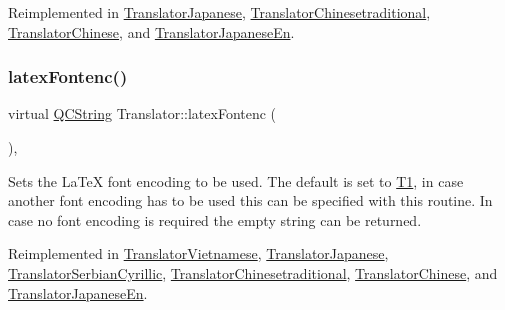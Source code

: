 Reimplemented in \mbox{\hyperlink{class_translator_japanese_abcfec41fcfaf972e191aa2bf14057b2f}{Translator\+Japanese}}, \mbox{\hyperlink{class_translator_chinesetraditional_a76884101bd57a4a09883de76da69aa3f}{Translator\+Chinesetraditional}}, \mbox{\hyperlink{class_translator_chinese_aab889b0b3d8f44915e8b56ecf9e3e5df}{Translator\+Chinese}}, and \mbox{\hyperlink{class_translator_japanese_en_a33a1f40ad9680e0277b0d47bb40af96e}{Translator\+Japanese\+En}}.

\mbox{\label{class_translator_a573b483369d8d7cf7d85831a9da356be}} 
\subsubsection{\texorpdfstring{latexFontenc()}{latexFontenc()}}
{\footnotesize\ttfamily virtual \mbox{\hyperlink{class_q_c_string}{Q\+C\+String}} Translator\+::latex\+Fontenc (\begin{DoxyParamCaption}{ }\end{DoxyParamCaption})\hspace{0.3cm}{\ttfamily [inline]}, {\ttfamily [virtual]}}

Sets the La\+TeX font encoding to be used. The default is set to {\ttfamily \mbox{\hyperlink{class_t1}{T1}}}, in case another font encoding has to be used this can be specified with this routine. In case no font encoding is required the empty string can be returned. 

Reimplemented in \mbox{\hyperlink{class_translator_vietnamese_aa6626da0407f685b42d9c40bdf83b62e}{Translator\+Vietnamese}}, \mbox{\hyperlink{class_translator_japanese_aff9e398a5bba5fa1e345ffba08964466}{Translator\+Japanese}}, \mbox{\hyperlink{class_translator_serbian_cyrillic_a6c20ea532f61ab33968dbb951299fc6b}{Translator\+Serbian\+Cyrillic}}, \mbox{\hyperlink{class_translator_chinesetraditional_a98a1eb93c4d1ab29d05afcdef3ec33bc}{Translator\+Chinesetraditional}}, \mbox{\hyperlink{class_translator_chinese_a175c453b04357c5b3646e92137783345}{Translator\+Chinese}}, and \mbox{\hyperlink{class_translator_japanese_en_a591b9073a3c3b05b85bc2dbb5f0f2436}{Translator\+Japanese\+En}}.

\mbox{\label{class_translator_a9953a4c0e6a4fc7d017abcd5c2939e0f}} 
